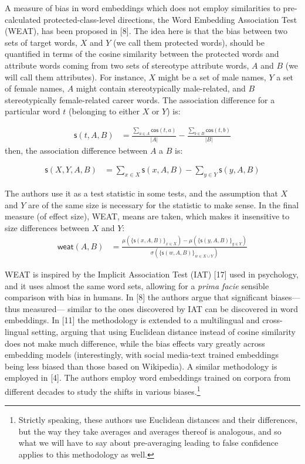\documentclass[
  12pt,
  dvipsnames,enabledeprecatedfontcommands]{scrartcl}
\begin{document}
A measure of bias in word embeddings which does not employ similarities
to pre-calculated protected-class-level directions, the Word Embedding
Association Test (\textsf{WEAT}), has been proposed in {[}8{]}. The idea
here is that the bias between two sets of target words, \(X\) and \(Y\)
(we call them protected words), should be quantified in terms of the
cosine similarity between the protected words and attribute words coming
from two sets of stereotype attribute words, \(A\) and \(B\) (we will
call them attributes). For instance, \(X\) might be a set of male names,
\(Y\) a set of female names, \(A\) might contain stereotypically
male-related, and \(B\) stereotypically female-related career words. The
association difference for a particular word \(t\) (belonging to either
\(X\) or \(Y\)) is:

\vspace{-2mm}

\begin{align}
\label{eq:stAB}
\mathsf{s}(t,A,B) & = \frac{\sum_{a\in A}\mathsf{cos}(t,a)}{\vert A\vert} - \frac{\sum_{b\in B}\mathsf{cos}(t,b)}{\vert B\vert}
\end{align} \normalsize \noindent then, the association difference
between \(A\) a \(B\) is:

\begin{align}
\label{eq:sXYAB}
\mathsf{s}(X,Y,A,B) & = \sum_{x\in X} \mathsf{s}(x,A,B) -  \sum_{y\in Y} \mathsf{s}(y,A,B)
\end{align}

\noindent The authors use it as a test statistic in some tests, and the
assumption that \(X\) and \(Y\) are of the same size is necessary for
the statistic to make sense. In the final measure (of effect size),
\textsf{WEAT}, means are taken, which makes it insensitive to size
differences between \(X\) and \(Y\): \begin{align}
\mathsf{weat}(A,B) & = \frac{
\mu(\{\mathsf{s}(x,A,B)\}_{x\in X}) -\mu(\{\mathsf{s}(y,A,B)\}_{y\in Y}) 
}{
\sigma(\{\mathsf{s}(w,A,B)\}_{w\in X\cup Y})
}
\end{align}

\textsf{WEAT} is inspired by the Implicit Association Test (IAT)
{[}17{]} used in psychology, and it uses almost the same word sets,
allowing for a \emph{prima facie} sensible comparison with bias in
humans. In {[}8{]} the authors argue that significant biases---thus
measured--- similar to the ones discovered by IAT can be discovered in
word embeddings. In {[}11{]} the methodology is extended to a
multilingual and cross-lingual setting, arguing that using Euclidean
distance instead of cosine similarity does not make much difference,
while the bias effects vary greatly across embedding models
(interestingly, with social media-text trained embeddings being less
biased than those based on Wikipedia). A similar methodology is employed
in {[}4{]}. The authors employ word embeddings trained on corpora from
different decades to study the shifts in various biases.\footnote{Strictly
  speaking, these authors use Euclidean distances and their differences,
  but the way they take averages and averages thereof is analogous, and
  so what we will have to say about pre-averaging leading to false
  confidence applies to this methodology as well.}
\end{document}
